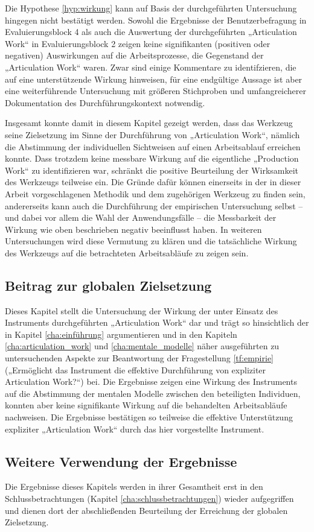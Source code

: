 Die Hypothese \ref{hyp:wirkung} kann auf Basis der durchgeführten Untersuchung hingegen nicht bestätigt werden. Sowohl die Ergebnisse der Benutzerbefragung in Evaluierungsblock 4 als auch die Auswertung der durchgeführten „Articulation Work“ in Evaluierungsblock 2 zeigen keine signifikanten (positiven oder negativen) Auswirkungen auf die Arbeitsprozesse, die Gegenstand der „Articulation Work“ waren. Zwar sind einige Kommentare zu identifzieren, die auf eine unterstützende Wirkung hinweisen, für eine endgültige Aussage ist aber eine weiterführende Untersuchung mit größeren Stichproben und umfangreicherer Dokumentation des Durchführungskontext notwendig. 

Insgesamt konnte damit in diesem Kapitel gezeigt werden, dass das Werkzeug seine Zielsetzung im Sinne der Durchführung von „Articulation Work“, nämlich die Abstimmung der individuellen Sichtweisen auf einen Arbeitsablauf erreichen konnte. Dass trotzdem keine messbare Wirkung auf die eigentliche „Production Work“ zu identifizieren war, schränkt die positive Beurteilung der Wirksamkeit des Werkzeugs teilweise ein. Die Gründe dafür können einerseits in der in dieser Arbeit vorgeschlagenen Methodik und dem zugehörigen Werkzeug zu finden sein, andererseits kann auch die Durchführung der empirischen Untersuchung selbst -- und dabei vor allem die Wahl der Anwendungsfälle -- die Messbarkeit der Wirkung wie oben beschrieben negativ beeinflusst haben. In weiteren Untersuchungen wird diese Vermutung zu klären und die tatsächliche Wirkung des Werkzeugs auf die betrachteten Arbeitsabläufe zu zeigen sein.

\subsection{Beitrag zur globalen Zielsetzung}

Dieses Kapitel stellt die Untersuchung der Wirkung der unter Einsatz des Instruments durchgeführten „Articulation Work“ dar und trägt so hinsichtlich der in Kapitel \ref{cha:einführung} argumentieren und in den Kapiteln \ref{cha:articulation_work} und \ref{cha:mentale_modelle} näher ausgeführten zu untersuchenden Aspekte zur Beantwortung der Fragestellung \ref{tf:empirie} („Ermöglicht das Instrument die effektive Durchführung von expliziter Articulation Work?“) bei. Die Ergebnisse zeigen eine Wirkung des Instruments auf die Abstimmung der mentalen Modelle zwischen den beteiligten Individuen, konnten aber keine signifikante Wirkung auf die behandelten Arbeitsabläufe nachweisen. Die Ergebnisse bestätigen so teilweise die effektive Unterstützung expliziter „Articulation Work“ durch das hier vorgestellte Instrument.

\subsection{Weitere Verwendung der Ergebnisse}

Die Ergebnisse dieses Kapitels werden in ihrer Gesamtheit erst in den Schlussbetrachtungen (Kapitel \ref{cha:schlussbetrachtungen}) wieder aufgegriffen und dienen dort der abschließenden Beurteilung der Erreichung der globalen Zielsetzung.


